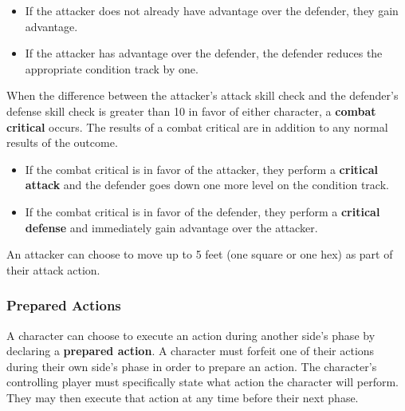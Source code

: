 \documentclass[11pt]{article}
\begin{document}
\begin{itemize}
	\item If the attacker does not already have advantage over the defender, they gain advantage.
	\item If the attacker has advantage over the defender, the defender reduces the appropriate  condition track by one.
\end{itemize}

When the difference between the attacker's attack skill check and the defender's defense skill check is greater than 10 in favor of either character, a \textbf{combat critical} occurs.
The results of a combat critical are in addition to any normal results of the outcome.

\begin{itemize}
	\item If the combat critical is in favor of the attacker, they perform a \textbf{critical attack} and the defender goes down one more level on the condition track.
	\item If the combat critical is in favor of the defender, they perform a \textbf{critical defense} and immediately gain advantage over the attacker.
\end{itemize}

An attacker can choose to move up to 5 feet (one square or one hex) as part of their attack action.

\subsubsection{Prepared Actions}
A character can choose to execute an action during another side's phase by declaring a \textbf{prepared action}.
A character must forfeit one of their actions during their own side's phase in order to prepare an action.
The character's controlling player must specifically state what action the character will perform.
They may then execute that action at any time before their next phase.
\end{document}
